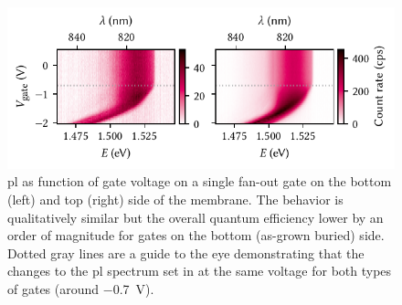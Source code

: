 \begin{figure}
    \centering
    \includegraphics{img/pdf/experiment/honey_H13_stark_shift_vs_gate}
    \caption[
        \protect\newline
    ]{
        \Gls{pl} as function of gate voltage on a single fan-out gate on the bottom (left) and top (right) side of the membrane.
        The behavior is qualitatively similar but the overall quantum efficiency lower by an order of magnitude for gates on the bottom (as-grown buried) side.
        Dotted gray lines are a guide to the eye demonstrating that the changes to the \gls{pl} spectrum set in at the same voltage for both types of gates (around \qty{-0.7}{\volt}).
    }
    \label{fig:exp:pl:honey_H13_stark_shift_vs_gate}
\end{figure}

